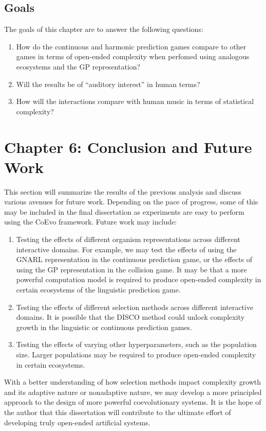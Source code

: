 \documentclass{article}
\begin{document}
\subsection*{Goals}
The goals of this chapter are to answer the following questions:
\begin{enumerate}
    \item How do the continuous and harmonic prediction games compare to other games in terms of 
        open-ended complexity when perfomed using analogous ecosystems and the GP representation?
    \item Will the results be of ``auditory interest'' in human terms?
    \item How will the interactions compare with human music in terms of statistical complexity?
\end{enumerate}

\section*{Chapter 6: Conclusion and Future Work}
This section will summarize the results of the previous analysis and discuss various
avenues for future work. Depending on the pace of progress, some of this may be included in the
final dissertation as experiments are easy to perform using the CoEvo framework. 
Future work may include:
\begin{enumerate}
    \item Testing the effects of different organism representations across different interactive
        domains. For example, we may test the effects of using the GNARL representation in the
        continuous prediction game, or the effects of using the GP representation in the collision
        game. It may be that a more powerful computation model is required to produce open-ended
        complexity in certain ecosystems of the linguistic prediction game.
    \item Testing the effects of different selection methods across different interactive domains.
        It is possible that the DISCO method could unlock complexity growth in the linguistic 
        or continuous prediction games.
    \item Testing the effects of varying other hyperparameters, such as the population size.   
        Larger populations may be required to produce open-ended complexity in certain ecosystems.
\end{enumerate}

With a better understanding of how selection methods impact complexity growth and its adaptive
nature or nonadaptive nature, we may develop a more principled approach
to the design of more powerful coevolutionary systems. It is the hope of the author that this
dissertation will contribute to the ultimate effort of developing truly open-ended artificial
systems.



\end{document}
